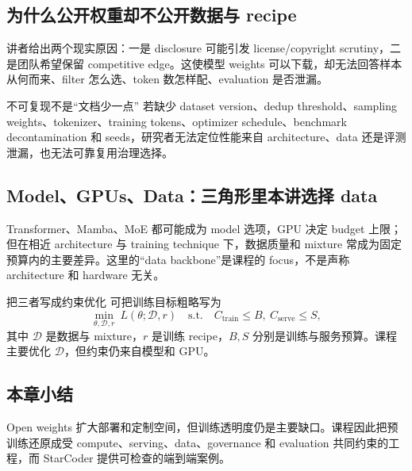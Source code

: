 \subsection{为什么公开权重却不公开数据与 recipe}

讲者给出两个现实原因：一是 disclosure 可能引发 license/copyright scrutiny，二是团队希望保留 competitive edge。这使模型 weights 可以下载，却无法回答样本从何而来、filter 怎么选、token 数怎样配、evaluation 是否泄漏。


\begin{warningbox}{不可复现不是“文档少一点”}
若缺少 dataset version、dedup threshold、sampling weights、tokenizer、training tokens、optimizer schedule、benchmark decontamination 和 seeds，研究者无法定位性能来自 architecture、data 还是评测泄漏，也无法可靠复用治理选择。
\end{warningbox}


\subsection{Model、GPUs、Data：三角形里本讲选择 data}

Transformer、Mamba、MoE 都可能成为 model 选项，GPU 决定 budget 上限；但在相近 architecture 与 training technique 下，数据质量和 mixture 常成为固定预算内的主要差异。这里的“data backbone”是课程的 focus，不是声称 architecture 和 hardware 无关。


\begin{knowledgebox}{把三者写成约束优化}
可把训练目标粗略写为
\[
\min_{\theta,\mathcal{D},r}\ L(\theta;\mathcal{D},r)
\quad\text{s.t.}\quad
C_{\text{train}}\le B,\ C_{\text{serve}}\le S,
\]
其中 $\mathcal{D}$ 是数据与 mixture，$r$ 是训练 recipe，$B,S$ 分别是训练与服务预算。课程主要优化 $\mathcal{D}$，但约束仍来自模型和 GPU。
\end{knowledgebox}


\subsection{本章小结}

Open weights 扩大部署和定制空间，但训练透明度仍是主要缺口。课程因此把预训练还原成受 compute、serving、data、governance 和 evaluation 共同约束的工程，而 StarCoder 提供可检查的端到端案例。


